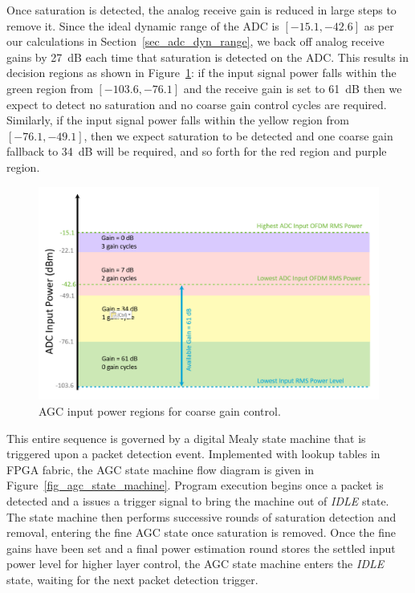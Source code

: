 	Once saturation is detected, the analog receive gain is reduced in large steps to remove it.
	Since the ideal dynamic range of the \ac{ADC} is $[-15.1, -42.6]$ as per our calculations in Section~\ref{sec_adc_dyn_range}, we back off analog receive gains by 27~dB each time that saturation is detected on the \ac{ADC}.
	This results in decision regions as shown in Figure~\ref{fig_agc_coarse_gain}: if the input signal power falls within the green region from $[-103.6, -76.1 ]$ and the receive gain is set to 61~dB then we expect to detect no saturation and no coarse gain control cycles are required.
	Similarly, if the input signal power falls within the yellow region from $[-76.1, -49.1 ]$, then we expect saturation to be detected and one coarse gain fallback to 34~dB will be required, and so forth for the red region and purple region.
	
\begin{figure}[ht]
\centering
\includegraphics[width=1\linewidth]{./figs/agc/agc_control_ranges}
\caption{AGC input power regions for coarse gain control.}
\label{fig_agc_coarse_gain}
\end{figure}
	
	This entire sequence is governed by a digital Mealy state machine that is triggered upon a packet detection event.
	Implemented with lookup tables in \ac{FPGA} fabric, the AGC state machine flow diagram is given in Figure~\ref{fig_agc_state_machine}.
	Program execution begins once a packet is detected and a issues a trigger signal to bring the machine out of \emph{IDLE} state.
	The state machine then performs successive rounds of saturation detection and removal, entering the fine AGC state once saturation is removed.
	Once the fine gains have been set and a final power estimation round stores the settled input power level for higher layer control, the AGC state machine enters the \emph{IDLE} state, waiting for the next packet detection trigger.
	
